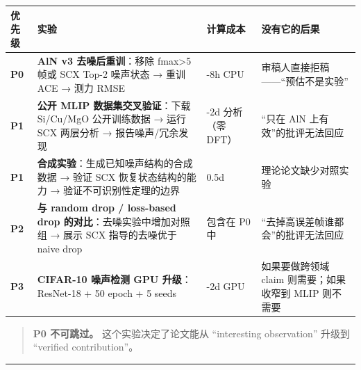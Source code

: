 \documentclass[
  12pt,
]{ctexart}
\begin{document}
\begin{longtable}[]{@{}
  >{\raggedright\arraybackslash}p{}
  >{\raggedright\arraybackslash}p{}
  >{\raggedright\arraybackslash}p{}
  >{\raggedright\arraybackslash}p{}@{}}
\toprule\noalign{}
\begin{minipage}[b]{\linewidth}\raggedright
优先级
\end{minipage} & \begin{minipage}[b]{\linewidth}\raggedright
实验
\end{minipage} & \begin{minipage}[b]{\linewidth}\raggedright
计算成本
\end{minipage} & \begin{minipage}[b]{\linewidth}\raggedright
没有它的后果
\end{minipage} \\
\midrule\noalign{}
\endhead
\bottomrule\noalign{}
\endlastfoot
\textbf{P0} & \textbf{AlN v3 去噪后重训}：移除 fmax\textgreater5 帧或
SCX Top-2 噪声状态 → 重训 ACE → 测力 RMSE & 4-8h CPU &
审稿人直接拒稿------``预估不是实验'' \\
\textbf{P1} & \textbf{公开 MLIP 数据集交叉验证}：下载 Si/Cu/MgO
公开训练数据 → 运行 SCX 两层分析 → 报告噪声/冗余发现 & 1-2d 分析（零
DFT） & ``只在 AlN 上有效''的批评无法回应 \\
\textbf{P1} & \textbf{合成实验}：生成已知噪声结构的合成数据 → 验证 SCX
恢复状态结构的能力 → 验证不可识别性定理的边界 & 0.5d &
理论论文缺少对照实验 \\
\textbf{P2} & \textbf{与 random drop / loss-based drop
的对比}：去噪实验中增加对照组 → 展示 SCX 指导的去噪优于 naive drop &
包含在 P0 中 & ``去掉高误差帧谁都会''的批评无法回应 \\
\textbf{P3} & \textbf{CIFAR-10 噪声检测 GPU 升级}：ResNet-18 + 50 epoch
+ 5 seeds & 1-2d GPU & 如果要做跨领域 claim 则需要；如果收窄到 MLIP
则不需要 \\
\end{longtable}

\begin{quote}
\textbf{P0 不可跳过。} 这个实验决定了论文能从 ``interesting
observation'' 升级到 ``verified contribution''。
\end{quote}

\begin{center}\rule{0.5\linewidth}{0.5pt}\end{center}
\end{document}
